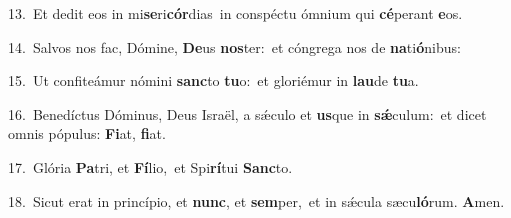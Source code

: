{\numbfont\textcolor{\numbcolor}{13.}}~Et dedit eos in mi\-\textbf{se}\-ri\-\textbf{cór}\-dias~\star in conspéctu ómnium qui \textbf{cé}\-perant \textbf{e}\-os.\par
{\numbfont\textcolor{\numbcolor}{14.}}~Salvos nos fac, Dómine, \textbf{De}\-us \textbf{nos}\-ter:~\star et cóngrega nos de \textbf{na}\-ti\-\textbf{ó}\-nibus:\par
{\numbfont\textcolor{\numbcolor}{15.}}~Ut confiteámur nómini \textbf{sanc}\-to \textbf{tu}\-o:~\star et gloriémur in \textbf{lau}\-de \textbf{tu}\-a.\par
{\numbfont\textcolor{\numbcolor}{16.}}~Benedíctus Dóminus, Deus Israël, a sǽculo et \textbf{us}\-que in \textbf{sǽ}\-culum:~\star et dicet omnis pópulus: \textbf{Fi}\-at, \textbf{fi}\-at.\par
{\numbfont\textcolor{\numbcolor}{17.}}~Glória \textbf{Pa}\-tri, et \textbf{Fí}\-lio,~\star et Spi\-\textbf{rí}\-tui \textbf{Sanc}\-to.\par
{\numbfont\textcolor{\numbcolor}{18.}}~Sicut erat in princípio, et \textbf{nunc}\-, et \textbf{sem}\-per,~\star et in sǽcula sæcu\-\textbf{ló}\-rum. \textbf{A}\-men.\par
